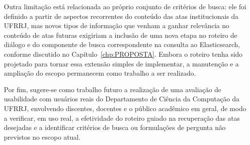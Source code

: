 Outra limitação está relacionada ao próprio conjunto de critérios de busca: ele foi definido a partir de aspectos recorrentes do conteúdo das atas institucionais da UFRRJ, mas novos tipos de informação que venham a ganhar relevância no conteúdo de atas futuras exigiriam a inclusão de uma nova etapa no roteiro de diálogo e do componente de busca correspondente na consulta ao Elasticsearch, conforme discutido no Capítulo~\ref{chp:PROPOSTA}. Embora o roteiro tenha sido projetado para tornar essa extensão simples de implementar, a manutenção e a ampliação do escopo permanecem como trabalho a ser realizado.

Por fim, sugere-se como trabalho futuro a realização de uma avaliação de usabilidade com usuários reais do Departamento de Ciência da Computação da UFRRJ, envolvendo discentes, docentes e o público acadêmico em geral, de modo a verificar, em uso real, a efetividade do roteiro guiado na recuperação das atas desejadas e a identificar critérios de busca ou formulações de pergunta não previstos no escopo atual.
